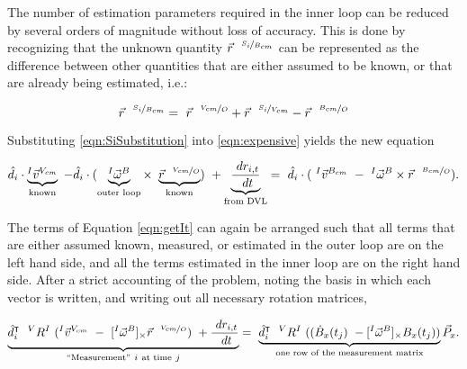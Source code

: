 
The number of estimation parameters required in the inner loop can be reduced by several orders of magnitude without loss of accuracy. This is done by recognizing that the unknown quantity $\vec{r}^{~~\nicefrac{S_i}{B_{cm}}}$ can be represented as the difference between other quantities that are either assumed to be known, or that are already being estimated, i.e.:

\begin{equation}
    \label{eqn:SiSubstitution}
    \vec{r}^{~~\nicefrac{S_i}{B_{cm}}}  = ~\vec{r}^{~~\nicefrac{V_{cm}}{O}} + \vec{r}^{~~\nicefrac{S_i}{V_{cm}}} - \vec{r}^{~~\nicefrac{B_{cm}}{O}}
\end{equation}

Substituting \ref{eqn:SiSubstitution} into \ref{eqn:expensive} yields the new equation

     \begin{equation}
 \hat{d}_i\cdot\underbrace{^{I}\vec{v}^{V_{cm}}}_\text{known} ~-
  \hat{d}_i\cdot(\underbrace{^{I}\vec{\omega}^{B}}_{\text{outer loop}}\times~\underbrace{\vec{r}^{~~\nicefrac{V_{cm}}{O}}}_\text{known}) ~+
 \underbrace{ \frac{~dr_{i,t}}{~dt}}_{\text{from DVL}}  
  =~\hat{d}_i\cdot(~^{I}\vec{v}^{B_{cm}} ~-
 ~^{I}\vec{\omega}^{B}\times\vec{r}^{~~\nicefrac{B_{cm}}{O}}).
 \label{eqn:getIt}
\end{equation}

The terms of Equation \ref{eqn:getIt} can again be arranged such that all terms that are either assumed known, measured, or estimated in the outer loop are on the left hand side, and all the terms estimated in the inner loop are on the right hand side. After a strict accounting of the problem, noting the basis in which each vector is written, and writing out all necessary rotation matrices,

\begin{equation}
 \underbrace{\hat{d}_i^{\intercal}~~^{V}R^I ~(^{I}\vec{v}^{V_{cm}} ~-~[^{I}\vec{\omega}^{B}]_\times\vec{r}^{~~\nicefrac{V_{cm}}{O}}) ~+
 \frac{~dr_{i,t}}{~dt} }_{``\text{Measurement}" ~i ~\text{at time}~ j}
  =~\underbrace{\hat{d}_i^{\intercal}~~{^{V}R^I} ~((\dot{B}_x(t_j)~-
 [^{I}\vec{\omega}^{B}]_\times B_x(t_j))}_\text{one row of the measurement matrix}\vec{P}_x.
 \label{eqn:finaldvl}
\end{equation}

